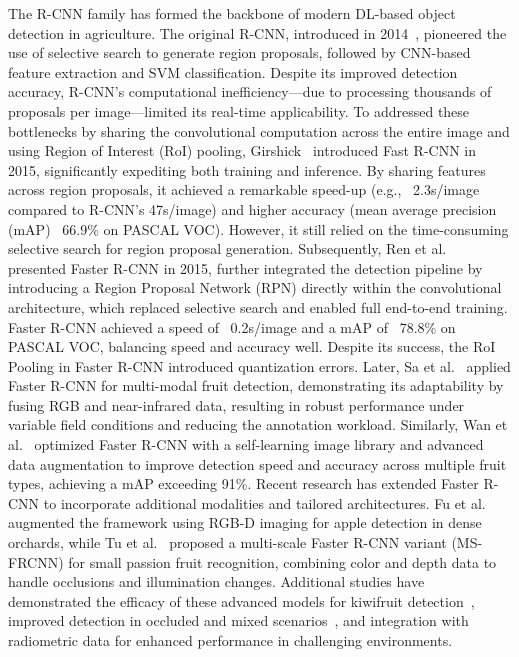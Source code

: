 \documentclass[a4paper,fleqn]{cas-dc}
\begin{document}
The R-CNN family has formed the backbone of modern DL-based object detection in agriculture. The original R-CNN, introduced in 2014~\cite{girshick2014rcnn}, pioneered the use of selective search to generate region proposals, followed by CNN-based feature extraction and SVM classification. Despite its improved detection accuracy, R-CNN's computational inefficiency—due to processing thousands of proposals per image—limited its real-time applicability.
To addressed these bottlenecks by sharing the convolutional computation across the entire image and using Region of Interest (RoI) pooling, Girshick~\cite{girshick2015fast} introduced Fast R-CNN in 2015, significantly expediting both training and inference. By sharing features across region proposals, it achieved a remarkable speed-up (e.g., ~2.3s/image compared to R-CNN's 47s/image) and higher accuracy (mean average precision (mAP) ~66.9\% on PASCAL VOC). However, it still relied on the time-consuming selective search for region proposal generation.
Subsequently, Ren et al. ~\cite{ren2015faster} presented Faster R-CNN in 2015, further integrated the detection pipeline by introducing a Region Proposal Network (RPN) directly within the convolutional architecture, which replaced selective search and enabled full end-to-end training. Faster R-CNN achieved a speed of ~0.2s/image and a mAP of ~78.8\% on PASCAL VOC, balancing speed and accuracy well. Despite its success, the RoI Pooling in Faster R-CNN introduced quantization errors. 
Later, Sa et al.~\cite{sa2016deepfruits} applied Faster R-CNN for multi-modal fruit detection, demonstrating its adaptability by fusing RGB and near-infrared data, resulting in robust performance under variable field conditions and reducing the annotation workload. Similarly, Wan et al.~\cite{wan2020faster} optimized Faster R-CNN with a self-learning image library and advanced data augmentation to improve detection speed and accuracy across multiple fruit types, achieving a mAP exceeding 91\%.
Recent research has extended Faster R-CNN to incorporate additional modalities and tailored architectures. Fu et al.\cite{fu2020faster} augmented the framework using RGB-D imaging for apple detection in dense orchards, while Tu et al.~\cite{tu2020passion} proposed a multi-scale Faster R-CNN variant (MS-FRCNN) for small passion fruit recognition, combining color and depth data to handle occlusions and illumination changes. Additional studies have demonstrated the efficacy of these advanced models for kiwifruit detection~\cite{fu2018kiwifruit}, improved detection in occluded and mixed scenarios~\cite{gene2019multi, mu2020intact}, and integration with radiometric data for enhanced performance in challenging environments.
\end{document}
